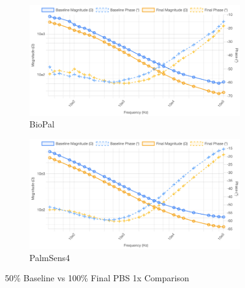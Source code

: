 \begin{figure}[H]
    \centering
    \begin{subfigure}{0.48\textwidth}   
        \includegraphics[width=\textwidth]{PBS_50_cropped.png}
        \caption{BioPal}
        \label{fig:50_pbs_biopal}
    \end{subfigure}
    \hfill
    \begin{subfigure}{0.48\textwidth}
        \includegraphics[width=\textwidth]{PalmSens_50.png}
        \caption{PalmSens4}
        \label{fig:50_pbs_palmsens}
    \end{subfigure}
    \caption{50\% Baseline vs 100\% Final PBS 1x Comparison}
    \label{fig:50_pbs_comparison}
\end{figure}


